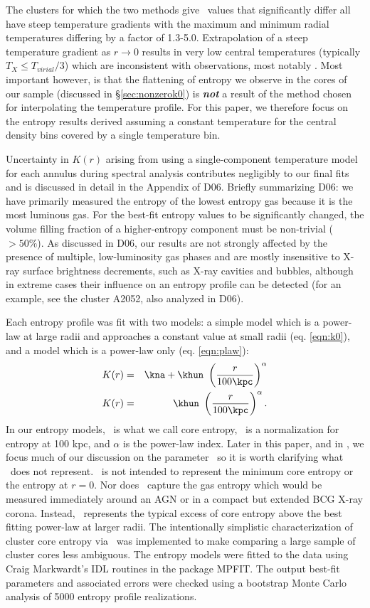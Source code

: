 \documentclass{emulateapj}
\begin{document}
The clusters for which the two methods give \kna\ values that
significantly differ all have steep temperature gradients with the
maximum and minimum radial temperatures differing by a factor of
1.3-5.0. Extrapolation of a steep temperature gradient as $r
\rightarrow 0$ results in very low central temperatures (typically
$T_X \leq T_{virial}/3$) which are inconsistent with observations,
most notably \citet{peterson03}. Most important however, is that the
flattening of entropy we observe in the cores of our sample (discussed
in \S\ref{sec:nonzerok0}) is {\bfseries\em{not}} a result of the
method chosen for interpolating the temperature profile. For this
paper, we therefore focus on the entropy results derived assuming a
constant temperature for the central density bins covered by a single
temperature bin.

Uncertainty in $K(r)$ arising from using a single-component
temperature model for each annulus during spectral analysis
contributes negligibly to our final fits and is discussed in detail in
the Appendix of D06. Briefly summarizing D06: we have primarily
measured the entropy of the lowest entropy gas because it is the most
luminous gas. For the best-fit entropy values to be significantly
changed, the volume filling fraction of a higher-entropy component
must be non-trivial ($> 50\%$). As discussed in D06, our results are
not strongly affected by the presence of multiple, low-luminosity gas
phases and are mostly insensitive to X-ray surface brightness
decrements, such as X-ray cavities and bubbles, although in extreme
cases their influence on an entropy profile can be detected (for an
example, see the cluster A2052, also analyzed in D06).

Each entropy profile was fit with two models: a simple model which is
a power-law at large radii and approaches a constant value at small
radii (eq. \ref{eqn:k0}), and a model which is a power-law only
(eq. \ref{eqn:plaw}):
\begin{eqnarray}
K(r) &=& \kna + \khun\ \left(\frac{r}{100 \kpc}\right)^{\alpha}\label{eqn:k0}\\
K(r) &=& \khun\ \left(\frac{r}{100 \kpc}\right)^{\alpha}\label{eqn:plaw}.
\end{eqnarray}
In our entropy models, \kna\ is what we call core entropy, \khun\ is a
normalization for entropy at 100 kpc, and $\alpha$ is the power-law
index. Later in this paper, and in \citet{haradent}, we focus much of
our discussion on the parameter \kna\ so it is worth clarifying what
\kna\ does not represent. \kna\ is not intended to represent the
minimum core entropy or the entropy at $r=0$. Nor does \kna\ capture
the gas entropy which would be measured immediately around an AGN or
in a compact but extended BCG X-ray corona. Instead, \kna\ represents
the typical excess of core entropy above the best fitting power-law at
larger radii. The intentionally simplistic characterization of cluster
core entropy via \kna\ was implemented to make comparing a large
sample of cluster cores less ambiguous. The entropy models were fitted
to the data using Craig Markwardt's IDL routines in the package
MPFIT. The output best-fit parameters and associated errors were
checked using a bootstrap Monte Carlo analysis of 5000 entropy
profile realizations.
\end{document}

